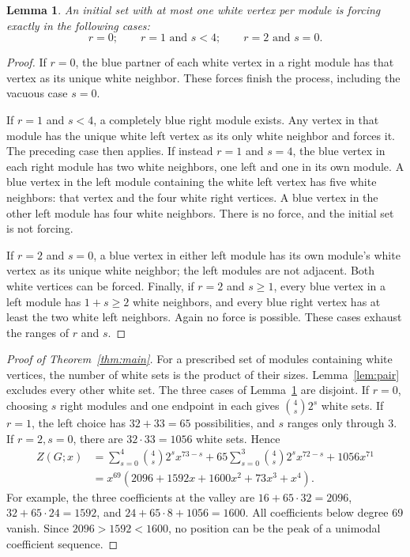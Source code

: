 \documentclass[11pt]{article}
\newtheorem{lemma}[theorem]{Lemma}
\begin{document}
\begin{lemma}\label{lem:cases}
An initial set with at most one white vertex per module is forcing
exactly in the following cases:
\[
 r=0;\qquad r=1\text{ and }s<4;\qquad r=2\text{ and }s=0.
\]
\end{lemma}
\begin{proof}
If $r=0$, the blue partner of each white vertex in a right module
has that vertex as its unique white neighbor. These forces finish the
process, including the vacuous case $s=0$.

If $r=1$ and $s<4$, a completely blue right module exists. Any vertex
in that module has the unique white left vertex as its only white
neighbor and forces it. The preceding case then applies. If instead
$r=1$ and $s=4$, the blue vertex in each right module has two white
neighbors, one left and one in its own module. A blue vertex in the
left module containing the white left vertex has five white neighbors:
that vertex and the four white right vertices. A blue vertex in the
other left module has four white neighbors. There is no force, and
the initial set is not forcing.

If $r=2$ and $s=0$, a blue vertex in either left module has its own
module's white vertex as its unique white neighbor; the left modules
are not adjacent. Both white vertices can be forced. Finally, if $r=2$
and $s\geq1$, every blue vertex in a left module has $1+s\geq2$ white
neighbors, and every blue right vertex has at least the two white left
neighbors. Again no force is possible. These cases exhaust the ranges
of $r$ and $s$.
\end{proof}

\begin{proof}[Proof of Theorem~\ref{thm:main}]
For a prescribed set of modules containing white vertices, the number
of white sets is the product of their sizes. Lemma~\ref{lem:pair}
excludes every other white set. The three cases of Lemma~\ref{lem:cases}
are disjoint. If $r=0$, choosing $s$ right modules and one endpoint in
each gives $\binom4s2^s$ white sets. If $r=1$, the left choice has
$32+33=65$ possibilities, and $s$ ranges only through 3. If $r=2,s=0$,
there are $32\cdot33=1056$ white sets. Hence
\begin{align*}
 Z(G;x)
 &=\sum_{s=0}^4\binom4s2^s x^{73-s}
   +65\sum_{s=0}^3\binom4s2^s x^{72-s}+1056x^{71}\\
 &=x^{69}(2096+1592x+1600x^2+73x^3+x^4).
\end{align*}
For example, the three coefficients at the valley are
$16+65\cdot32=2096$, $32+65\cdot24=1592$, and
$24+65\cdot8+1056=1600$. All coefficients below degree 69 vanish.
Since $2096>1592<1600$, no position can be the peak of a unimodal
coefficient sequence.
\end{proof}
\end{document}
